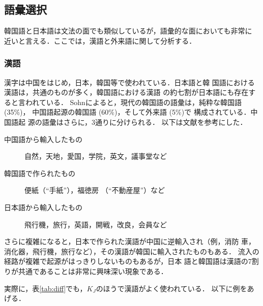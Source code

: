 \subsection{語彙選択}
\label{sec:choice}
韓国語と日本語は文法の面でも類似しているが，語彙的な面においても非常に
近いと言える．ここでは，漢語と外来語に関して分析する．


\subsubsection{漢語}
\label{sec:lexcial}
漢字は中国をはじめ，日本，韓国等で使われている．日本語と韓
国語における漢語は，共通のものが多く，韓国語における漢語
の約七割が日本語にも存在すると言われている\cite{Watanabe:1981}．
Sohnによると，現代の韓国語の語彙は，純粋な韓国語 (35\%)，
中国語起源の韓国語 (60\%)，そして外来語 (5\%)で
構成されている\cite{Sohn:1999}．中国語起
源の語彙はさらに，3通りに分けられる．
以下は文献\cite{Chang:2000}を参考にした．
\begin{description}
\item[中国語から輸入したもの] 自然，天地，愛国，学院，英文，議事堂など
\item[韓国語で作られたもの] 便紙（``手紙''），福徳房 （``不動産屋''）など
\item[日本語から輸入したもの] 飛行機，旅行，英語，開戦，改良，会員など
\end{description}
さらに複雑になると，日本で作られた漢語が中国に逆輸入され（例，消防
車，消化器，飛行機，旅行など），その漢語が韓国に輸入されたものもある．
流入の経路が複雑で起源がはっきりしないものもあるが，日本
語と韓国語は漢語の7割りが共通であることは非常に興味深い現象である．

実際に，表\ref{tab:diff}でも，$K_J$のほうで漢語がよく使われている．
以下に例をあげる．

